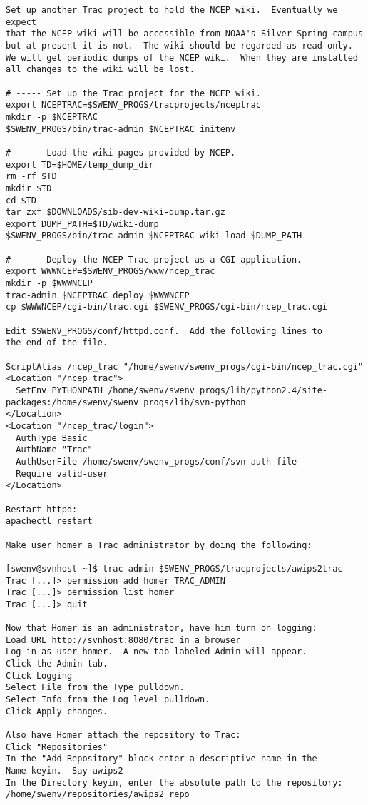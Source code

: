 \begin{verbatim}
Set up another Trac project to hold the NCEP wiki.  Eventually we expect
that the NCEP wiki will be accessible from NOAA's Silver Spring campus
but at present it is not.  The wiki should be regarded as read-only.
We will get periodic dumps of the NCEP wiki.  When they are installed
all changes to the wiki will be lost.

# ----- Set up the Trac project for the NCEP wiki.
export NCEPTRAC=$SWENV_PROGS/tracprojects/nceptrac
mkdir -p $NCEPTRAC
$SWENV_PROGS/bin/trac-admin $NCEPTRAC initenv

# ----- Load the wiki pages provided by NCEP.
export TD=$HOME/temp_dump_dir
rm -rf $TD
mkdir $TD
cd $TD
tar zxf $DOWNLOADS/sib-dev-wiki-dump.tar.gz
export DUMP_PATH=$TD/wiki-dump
$SWENV_PROGS/bin/trac-admin $NCEPTRAC wiki load $DUMP_PATH

# ----- Deploy the NCEP Trac project as a CGI application.
export WWWNCEP=$SWENV_PROGS/www/ncep_trac
mkdir -p $WWWNCEP
trac-admin $NCEPTRAC deploy $WWWNCEP
cp $WWWNCEP/cgi-bin/trac.cgi $SWENV_PROGS/cgi-bin/ncep_trac.cgi

Edit $SWENV_PROGS/conf/httpd.conf.  Add the following lines to
the end of the file.

ScriptAlias /ncep_trac "/home/swenv/swenv_progs/cgi-bin/ncep_trac.cgi"
<Location "/ncep_trac">
  SetEnv PYTHONPATH /home/swenv/swenv_progs/lib/python2.4/site-packages:/home/swenv/swenv_progs/lib/svn-python
</Location>
<Location "/ncep_trac/login">
  AuthType Basic
  AuthName "Trac"
  AuthUserFile /home/swenv/swenv_progs/conf/svn-auth-file
  Require valid-user
</Location>

Restart httpd:
apachectl restart

Make user homer a Trac administrator by doing the following:

[swenv@svnhost ~]$ trac-admin $SWENV_PROGS/tracprojects/awips2trac
Trac [...]> permission add homer TRAC_ADMIN
Trac [...]> permission list homer
Trac [...]> quit

Now that Homer is an administrator, have him turn on logging:
Load URL http://svnhost:8080/trac in a browser
Log in as user homer.  A new tab labeled Admin will appear.
Click the Admin tab.
Click Logging
Select File from the Type pulldown.
Select Info from the Log level pulldown.
Click Apply changes.

Also have Homer attach the repository to Trac:
Click "Repositories"
In the "Add Repository" block enter a descriptive name in the
Name keyin.  Say awips2
In the Directory keyin, enter the absolute path to the repository:
/home/swenv/repositories/awips2_repo


\end{verbatim}
